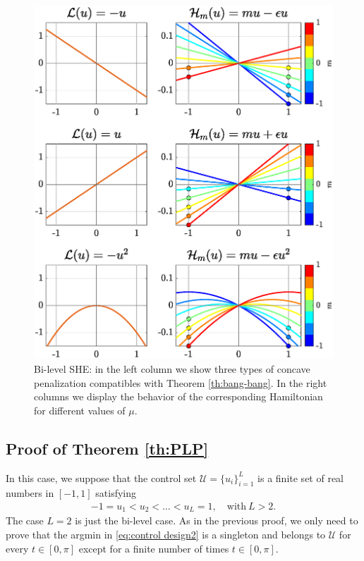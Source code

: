 \documentclass[twocolumn]{autart}    %
\begin{document}
\begin{figure}[h] 
	\centering
	\includegraphics[scale=0.415]{img/fig03.eps}
	\caption{Bi-level SHE: in the left column we show three types of concave penalization compatibles with Theorem \ref{th:bang-bang}. In the right columns we display the behavior of the corresponding Hamiltonian for different values of $\mu$.}\label{fig:Bang-Bang-penalization} 
\end{figure}
  
\subsection{Proof of Theorem \ref{th:PLP}}\label{proof:PLP}

In this case, we suppose that the control set $\mathcal{U} = \{ u_i\}_{i=1}^L$ is a finite set of real numbers in $[-1,1]$ satisfying
\begin{align*} 
	-1 = u_1 < u_2 <\ldots <u_L = 1, \quad \text{with} \ L> 2.
\end{align*} 
The case $L=2$ is just the bi-level case. As in the previous proof, we only need to prove that the argmin in \eqref{eq:control design2} is a singleton and belongs to $\mathcal{U}$ for every $t\in [0,\pi]$ except for a finite number of times $t\in [0,\pi]$.
\end{document}
